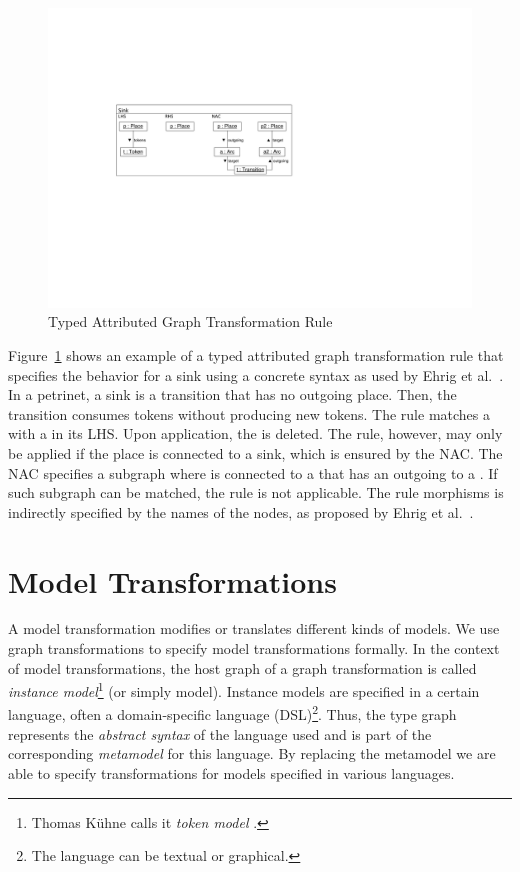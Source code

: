 \begin{figure}[htb]
  \centering
  \includegraphics[scale=1]{figures/TypedGTRule}
  \caption{Typed Attributed Graph Transformation Rule}
  \label{fig:typedGTRule}
\end{figure}

Figure~\ref{fig:typedGTRule} shows an example of a typed attributed graph transformation rule that specifies the behavior for a sink using a concrete syntax as used by Ehrig et al.~\cite{EEPT06}.
In a petrinet, a sink is a transition that has no outgoing place.
Then, the transition consumes tokens without producing new tokens.
The rule matches a  with a  in its LHS.
Upon application, the  is deleted.
The rule, however, may only be applied if the place  is connected to a sink, which is ensured by the NAC.
The NAC specifies a subgraph where  is connected to a  that has an outgoing  to a .
If such subgraph can be matched, the rule is not applicable.
The rule morphisms is indirectly specified by the names of the nodes, as proposed by Ehrig et al.~\cite{EEPT06}.


\section{Model Transformations}
\label{sec:modelTransformation}

A model transformation modifies or translates different kinds of models.
We use graph transformations to specify model transformations formally.
In the context of model transformations, the host graph of a graph transformation is called \emph{instance model}\footnote{Thomas K\"{u}hne calls it \emph{token model} \cite{Kue06}.} (or simply model).
Instance models are specified in a certain language, often a domain-specific language (DSL)\footnote{The language can be textual or graphical.}.
Thus, the type graph represents the \emph{abstract syntax} of the language used and is part of the corresponding \emph{metamodel} \cite{Kue06} for this language.
By replacing the metamodel we are able to specify transformations for models specified in various languages.

